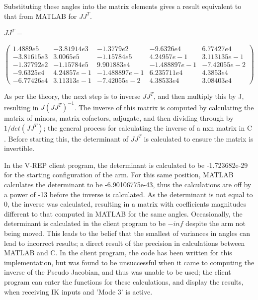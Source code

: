 \documentclass[12pt,openany,a4paper]{book}
\begin{document}
Substituting these angles into the matrix elements gives a result equivalent to that from MATLAB for $J J^T$.

\vspace{\baselineskip}
$J J^T = $
\begin{center}

$ \left(\begin{array}{ccccc} 
1.4889e5 & -3.81914e3 & -1.3779e2 & -9.6326e4 & 6.77427e4 \\ 
-3.81615e3 & 3.0065e5 & -1.15784e5 & 4.24957e-1 & 3.113135e-1 \\ 
-1.37792e2 & -1.15784e5 & 9.901883e4 & -1.488897e-1 & -7.42055e-2 \\ -9.6325e4 & 4.24857e-1 & -1.488897e-1 & 6.235711e4 & 4.3853e4 \\
-6.77426e4 & 3.11313e-1 & -7.42055e-2 & 4.38533e4 & 3.08403e4 

\end{array}\right)
$
\end{center}
\vspace{\baselineskip}
As per the theory, the next step is to inverse $J J^T$, and then multiply this by J, resulting in $J (J J^T)^{-1}$. The inverse of this matrix is computed by calculating the matrix of minors, matrix cofactors, adjugate, and then dividing through by $1/det(JJ^T)$; the general process for calculating the inverse of a nxn matrix in C \cite{invMatrix}. Before starting this, the determinant of $J J^T$ is calculated to ensure the matrix is invertible.

In the V-REP client program, the determinant is calculated to be -1.723682e-29 for the starting configuration of the arm. For this same position, MATLAB calculates the determinant to be -6.90106775e-43, thus the calculations are off by a power of -13 before the inverse is calculated. As the determinant is not equal to 0, the inverse was calculated, resulting in a matrix with coefficients magnitudes different to that computed in MATLAB for the same angles. Occasionally, the determinant is calculated in the client program to be $-inf$ despite the arm not being moved. This leads to the belief that the smallest of variances in angles can lead to incorrect results; a direct result of the precision in calculations between MATLAB and C. In the client program, the code has been written for this implementation, but was found to be unsuccessful when it came to computing the inverse of the Pseudo Jacobian, and thus was unable to be used; the client program can enter the functions for these calculations, and display the results, when receiving IK inputs and 'Mode 3' is active.
\end{document}
